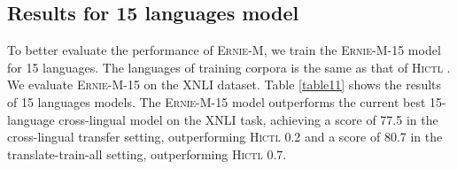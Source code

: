\documentclass[11pt]{article}
\begin{document}
\begin{table*}[!h]
\centering

\vskip 0.1in

\caption{Hyperparameters used for  fine-tuneing in Tatoeba.}
\label{table13}
\end{table*}


\subsection{Results for 15 languages model}

To better evaluate the performance of \textsc{Ernie-M}, we train the \textsc{Ernie-M}-15 model for 15 languages. The languages of training corpora is the same as that of \textsc{Hictl} \cite{wei2020learning}. We evaluate \textsc{Ernie-M}-15 on the XNLI dataset. Table \ref{table11} shows the results of 15 languages models. The \textsc{Ernie-M}-15 model outperforms the current best 15-language cross-lingual model on the XNLI task, achieving a score of 77.5 in the cross-lingual transfer setting, outperforming \textsc{Hictl} 0.2 and a score of 80.7 in the translate-train-all setting, outperforming \textsc{Hictl} 0.7. 
\end{document}
